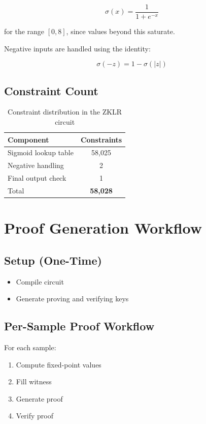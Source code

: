 \[
\sigma(x) = \frac{1}{1 + e^{-x}}  
\]

for the range \([0,8]\), since values beyond this saturate.

Negative inputs are handled using the identity:

\[
\sigma(-z) = 1 - \sigma(|z|)
\]

\subsection{Constraint Count}
\begin{table}[h]
\centering
\begin{tabular}{|l|c|}
\hline
Component & Constraints \\
\hline
Sigmoid lookup table & 58,025 \\
Negative handling & 2 \\
Final output check & 1 \\
\hline
Total & \textbf{58,028} \\
\hline
\end{tabular}
\caption{Constraint distribution in the ZKLR circuit}
\end{table}

\section{Proof Generation Workflow}\label{sec:workflow}

\subsection{Setup (One-Time)}
\begin{itemize}
    \item Compile circuit
    \item Generate proving and verifying keys
\end{itemize}

\subsection{Per-Sample Proof Workflow}
For each sample:
\begin{enumerate}
    \item Compute fixed-point values
    \item Fill witness
    \item Generate proof
    \item Verify proof
\end{enumerate}

